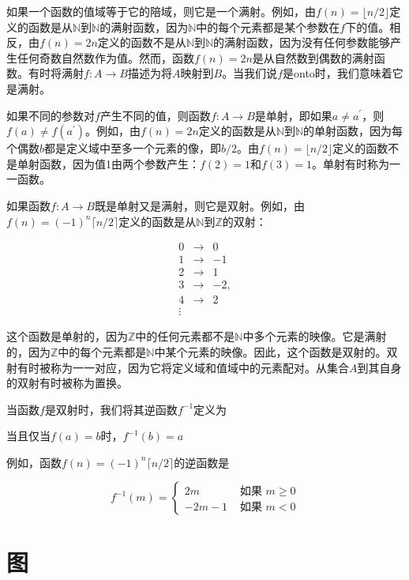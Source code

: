 \documentclass[lang=cn,newtx,10pt,scheme=chinese]{elegantbook}
\begin{document}
如果一个函数的值域等于它的陪域，则它是一个满射。例如，由$f(n)=\lfloor n / 2\rfloor$定义的函数是从$\mathbb{N}$到$\mathbb{N}$的满射函数，因为$\mathbb{N}$中的每个元素都是某个参数在$f$下的值。相反，由$f(n)=2 n$定义的函数不是从$\mathbb{N}$到$\mathbb{N}$的满射函数，因为没有任何参数能够产生任何奇数自然数作为值。然而，函数$f(n)=2 n$是从自然数到偶数的满射函数。有时将满射$f: A \rightarrow B$描述为将$A$映射到$B$。当我们说$f$是onto时，我们意味着它是满射。

如果不同的参数对$f$产生不同的值，则函数$f: A \rightarrow B$是单射，即如果$a \neq a^{\prime}$，则$f(a) \neq f(a^{\prime})$。例如，由$f(n)=2 n$定义的函数是从$\mathbb{N}$到$\mathbb{N}$的单射函数，因为每个偶数$b$都是定义域中至多一个元素的像，即$b / 2$。由$f(n)=\lfloor n / 2\rfloor$定义的函数不是单射函数，因为值1由两个参数产生：$f(2)=1$和$f(3)=1$。单射有时称为一一函数。

如果函数$f: A \rightarrow B$既是单射又是满射，则它是双射。例如，由$f(n)=(-1)^n\lceil n / 2\rceil$定义的函数是从$\mathbb{N}$到$\mathbb{Z}$的双射：

$$
\begin{array}{ccr}
0 & \rightarrow & 0 \\
1 & \rightarrow & -1 \\
2 & \rightarrow & 1 \\
3 & \rightarrow & -2, \\
4 & \rightarrow & 2 \\
\vdots &
\end{array}
$$

这个函数是单射的，因为$\mathbb{Z}$中的任何元素都不是$\mathbb{N}$中多个元素的映像。它是满射的，因为$\mathbb{Z}$中的每个元素都是$\mathbb{N}$中某个元素的映像。因此，这个函数是双射的。双射有时被称为一一对应，因为它将定义域和值域中的元素配对。从集合$A$到其自身的双射有时被称为置换。

当函数$f$是双射时，我们将其逆函数$f^{-1}$定义为

当且仅当$f(a)=b$时，$f^{-1}(b)=a$

例如，函数$f(n)=(-1)^n\lceil n / 2\rceil$的逆函数是

$$
f^{-1}(m)= \begin{cases}2 m & \text { 如果 } m \geq 0 \\ -2 m-1 & \text { 如果 } m<0\end{cases}
$$

\section{图}
\end{document}
